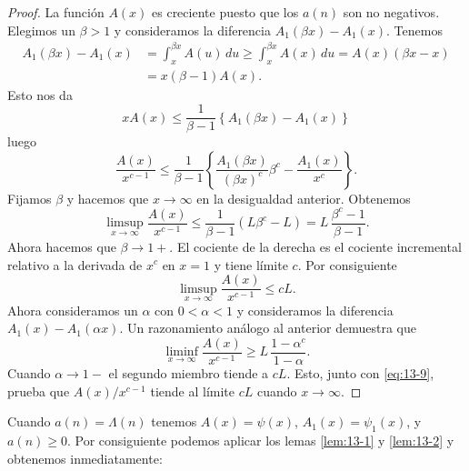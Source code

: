     \begin{proof}
        La función $A(x)$ es creciente puesto que los $a(n)$ son no negativos. Elegimos un
        $\beta>1$ y consideramos la diferencia $A_1(\beta x)-A_1(x)$. Tenemos
        \begin{align*}
            A_1(\beta x)-A_1(x)&=\int_x^{\beta x}A(u)\,du\geq\int_x^{\beta x}A(x)\,du=A(x)(\beta x-x)\\
            &=x(\beta-1)A(x).
        \end{align*}
        Esto nos da
        \begin{equation*}
            xA(x)\leq\frac{1}{\beta-1}\left\{A_1(\beta x)-A_1(x)\right\}
        \end{equation*}
        luego
        \begin{equation*}
            \frac{A(x)}{x^{c-1}}\leq\frac{1}{\beta-1}\left\{\frac{A_1(\beta x)}{(\beta x)^c}\beta^c-\frac{A_1(x)}{x^c}\right\}.
        \end{equation*}
        Fijamos $\beta$ y hacemos que $x\to\infty$ en la desigualdad anterior. Obtenemos
        \begin{equation*}
            \limsup_{x\to\infty}\frac{A(x)}{x^{c-1}}\leq\frac{1}{\beta-1}(L\beta^c-L)=L\,\frac{\beta^c-1}{\beta-1}.
        \end{equation*}
        Ahora hacemos que $\beta\to1+$. El cociente de la derecha es el cociente incremental
        relativo a la derivada de $x^c$ en $x=1$ y tiene límite $c$. Por consiguiente
        \begin{equation}\label{eq:13-9}
            \limsup_{x\to\infty}\frac{A(x)}{x^{c-1}}\leq cL.
        \end{equation}
        Ahora consideramos un $\alpha$ con $0<\alpha<1$ y consideramos la diferencia
        $A_1(x)-A_1(\alpha x)$. Un razonamiento análogo al anterior demuestra que
        \begin{equation*}
            \liminf_{x\to\infty}\frac{A(x)}{x^{c-1}}\geq L\,\frac{1-\alpha^c}{1-\alpha}.
        \end{equation*}
        Cuando $\alpha\to1-$ el segundo miembro tiende a $cL$. Esto, junto con
        \eqref{eq:13-9}, prueba que $A(x)/x^{c-1}$ tiende al límite $cL$ cuando
        $x\to\infty$.
    \end{proof}

    Cuando $a(n)=\Lambda(n)$ tenemos $A(x)=\psi(x)$, $A_1(x)=\psi_1(x)$, y $a(n)\geq0$. Por
    consiguiente podemos aplicar los lemas \ref{lem:13-1} y \ref{lem:13-2} y obtenemos
    inmediatamente:

